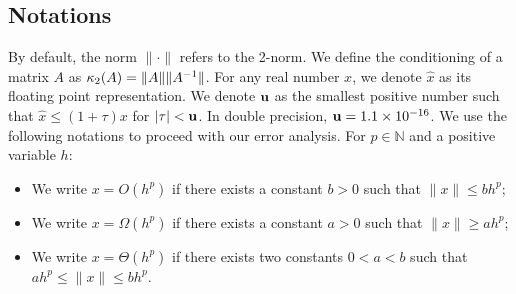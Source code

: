 \subsection{Notations}
By default, the norm $\|\cdot\|$ refers to the 2-norm.
We define the conditioning of a matrix $A$ as
$\kappa_2(A) = \| A \| \|A^{-1} \|$.
For any real number $x$, we denote $\widehat{x}$ as its floating
point representation.
We denote $\mathbf{u}$ as the smallest positive number such that
$\widehat{x} \leq (1 + \tau) x$ for $|\tau| < \mathbf{u}$.
In double precision, $\mathbf{u} = 1.1 \times 10^{-16}$.
We use the following notations to proceed with our error analysis.
For $p \in \mathbb{N}$ and a positive variable $h$:
\begin{itemize}
  \item We write $x = O(h^p)$ if there exists a constant $b > 0$
    such that $\| x \| \leq b h^p$;
  \item We write $x = \Omega(h^p)$ if there exists a constant $a > 0$
    such that $\| x \| \geq a h^p$;
  \item We write $x = \Theta(h^p)$ if there exists two constants $0 < a < b$
    such that $a h^p \leq \| x \| \leq b h^p$.
\end{itemize}

